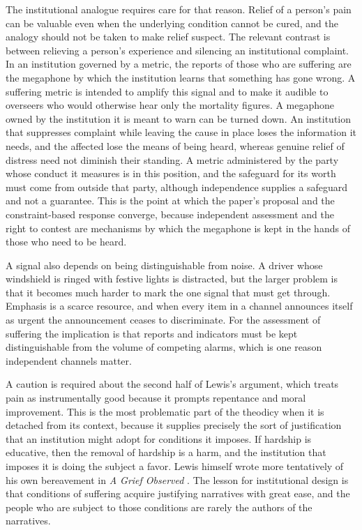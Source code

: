 \documentclass[11pt]{article}
\begin{document}
The institutional analogue requires care for that reason. Relief of a person's pain can be valuable even when the underlying condition cannot be cured, and the analogy should not be taken to make relief suspect. The relevant contrast is between relieving a person's experience and silencing an institutional complaint. In an institution governed by a metric, the reports of those who are suffering are the megaphone by which the institution learns that something has gone wrong. A suffering metric is intended to amplify this signal and to make it audible to overseers who would otherwise hear only the mortality figures. A megaphone owned by the institution it is meant to warn can be turned down. An institution that suppresses complaint while leaving the cause in place loses the information it needs, and the affected lose the means of being heard, whereas genuine relief of distress need not diminish their standing. A metric administered by the party whose conduct it measures is in this position, and the safeguard for its worth must come from outside that party, although independence supplies a safeguard and not a guarantee. This is the point at which the paper's proposal and the constraint-based response converge, because independent assessment and the right to contest are mechanisms by which the megaphone is kept in the hands of those who need to be heard.

A signal also depends on being distinguishable from noise. A driver whose windshield is ringed with festive lights is distracted, but the larger problem is that it becomes much harder to mark the one signal that must get through. Emphasis is a scarce resource, and when every item in a channel announces itself as urgent the announcement ceases to discriminate. For the assessment of suffering the implication is that reports and indicators must be kept distinguishable from the volume of competing alarms, which is one reason independent channels matter.

A caution is required about the second half of Lewis's argument, which treats pain as instrumentally good because it prompts repentance and moral improvement. This is the most problematic part of the theodicy when it is detached from its context, because it supplies precisely the sort of justification that an institution might adopt for conditions it imposes. If hardship is educative, then the removal of hardship is a harm, and the institution that imposes it is doing the subject a favor. Lewis himself wrote more tentatively of his own bereavement in \emph{A Grief Observed} \citep{lewis1961}. The lesson for institutional design is that conditions of suffering acquire justifying narratives with great ease, and the people who are subject to those conditions are rarely the authors of the narratives.
\end{document}

